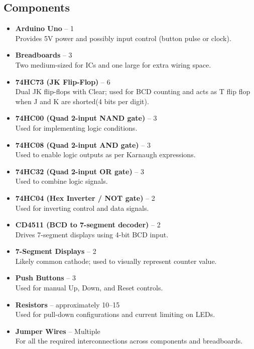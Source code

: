\documentclass{article}
\begin{document}
    \subsection{Components}
    \begin{itemize}
      \item \textbf{Arduino Uno} – 1 \\
      Provides 5V power and possibly input control (button pulse or clock).
    
      \item \textbf{Breadboards} – 3 \\
      Two medium-sized for ICs and one large for extra wiring space.
    
      \item \textbf{74HC73 (JK Flip-Flop)} – 6 \\
      Dual JK flip-flops with Clear; used for BCD counting and acts as T flip flop when J and K are shorted(4 bits per digit).
    
      \item \textbf{74HC00 (Quad 2-input NAND gate)} – 3 \\
      Used for implementing logic conditions.
    
      \item \textbf{74HC08 (Quad 2-input AND gate)} – 3 \\
      Used to enable logic outputs as per Karnaugh expressions.
    
      \item \textbf{74HC32 (Quad 2-input OR gate)} – 3 \\
      Used to combine logic signals.
    
      \item \textbf{74HC04 (Hex Inverter / NOT gate)} – 2 \\
      Used for inverting control and data signals.
    
      \item \textbf{CD4511 (BCD to 7-segment decoder)} – 2 \\
      Drives 7-segment displays using 4-bit BCD input.
    
      \item \textbf{7-Segment Displays} – 2 \\
      Likely common cathode; used to visually represent counter value.
    
      \item \textbf{Push Buttons} – 3 \\
      Used for manual Up, Down, and Reset controls.
    
      \item \textbf{Resistors} – approximately 10–15 \\
      Used for pull-down configurations and current limiting on LEDs.
    
      \item \textbf{Jumper Wires} – Multiple \\
      For all the required interconnections across components and breadboards.
    \end{itemize}
\end{document}
